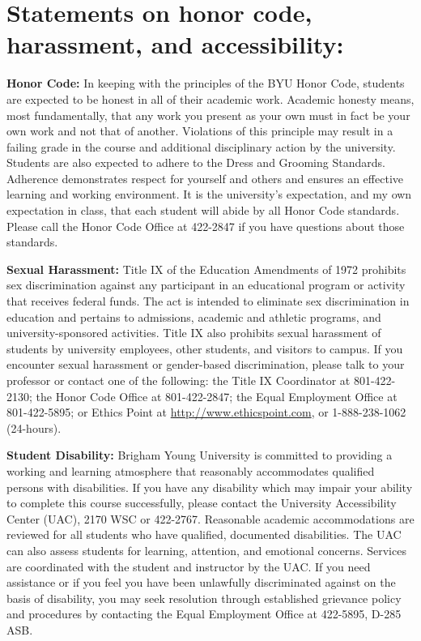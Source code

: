 \documentclass[11pt]{article}
\begin{document}
\section*{Statements on honor code, harassment, and accessibility:}

\textbf{\large Honor Code:}
In keeping with the principles of the BYU Honor Code, students are expected to be honest in all of
their academic work. Academic honesty means, most fundamentally, that any work you present as your
own must in fact be your own work and not that of another. Violations of this principle may result
in a failing grade in the course and additional disciplinary action by the university. Students are
also expected to adhere to the Dress and Grooming Standards. Adherence demonstrates respect for
yourself and others and ensures an effective learning and working environment. It is the
university's expectation, and my own expectation in class, that each student will abide by all
Honor Code standards. Please call the Honor Code Office at 422-2847 if you have questions about
those standards.

\textbf{\large Sexual Harassment:}
Title IX of the Education Amendments of 1972 prohibits sex discrimination against any participant
in an educational program or activity that receives federal funds. The act is intended to eliminate
sex discrimination in education and pertains to admissions, academic and athletic programs, and
university-sponsored activities. Title IX also prohibits sexual harassment of students by
university employees, other students, and visitors to campus. If you encounter sexual harassment or
gender-based discrimination, please talk to your professor or contact one of the following: the
Title IX Coordinator at 801-422-2130; the Honor Code Office at 801-422-2847; the Equal Employment
Office at 801-422-5895; or Ethics Point at \url{http://www.ethicspoint.com}, or 1-888-238-1062
(24-hours).

\textbf{\large Student Disability:}
Brigham Young University is committed to providing a working and learning atmosphere that
reasonably accommodates qualified persons with disabilities. If you have any disability which may
impair your ability to complete this course successfully, please contact the University
Accessibility Center (UAC), 2170 WSC or 422-2767. Reasonable academic accommodations are reviewed
for all students who have qualified, documented disabilities. The UAC can also assess students for
learning, attention, and emotional concerns. Services are coordinated with the student and
instructor by the UAC. If you need assistance or if you feel you have been unlawfully discriminated
against on the basis of disability, you may seek resolution through established grievance policy
and procedures by contacting the Equal Employment Office at 422-5895, D-285 ASB.
\end{document}
